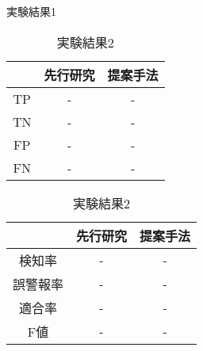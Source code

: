 \begin{table}[htbp]
    \centering
    \begin{minipage}{0.45\textwidth}  %
        \centering
        \caption{実験結果1}  %
        \begin{tabular}{|c|c|c|}  %
            \hline  %
            ~ &先行研究 & 提案手法\\  %
            \hline  %
            TP & - & -\\  %
            \hline  %
            TN & - & -\\  %
            \hline  %
            FP & - & -\\  %
            \hline  %
            FN & - & -\\  %
            \hline  %
        \end{tabular}
        \label{result2}  %
    \end{minipage} \hspace{1cm}  %
    \begin{minipage}{0.45\textwidth}  %
        \centering
        \caption{実験結果2}  %
        \begin{tabular}{|c|c|c|}  %
            \hline  %
            ~ &先行研究 & 提案手法\\  %
            \hline  %
            検知率 & - & -\\  %
            \hline  %
            誤警報率 & - & -\\  %
            \hline  %
            適合率 & - & -\\  %
            \hline  %
            F値 & - & -\\  %
            \hline  %
        \end{tabular}
        \label{result3}  %
    \end{minipage}
\end{table}
